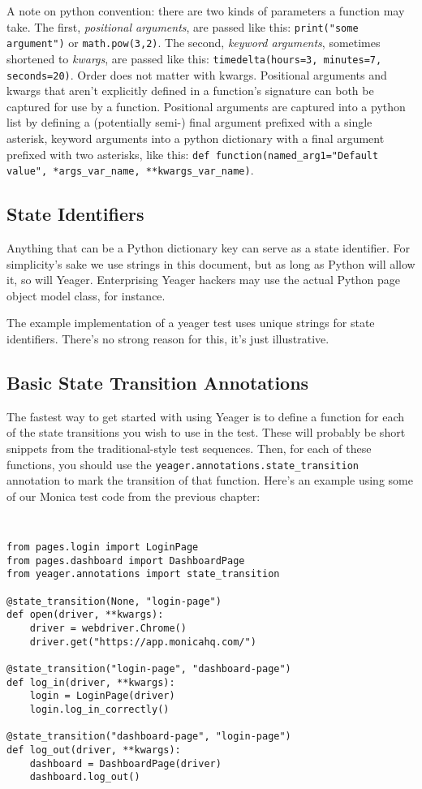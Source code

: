 A note on python convention: there are two kinds of parameters a function may take. The first, \textit{positional arguments}, are passed like this: \texttt{print("some argument")} or \texttt{math.pow(3,2)}. The second, \textit{keyword arguments}, sometimes shortened to \textit{kwargs}, are passed like this: \texttt{timedelta(hours=3, minutes=7, seconds=20)}. Order does not matter with kwargs. Positional arguments and kwargs that aren't explicitly defined in a function's signature can both be captured for use by a function. Positional arguments are captured into a python list by defining a (potentially semi-) final argument prefixed with a single asterisk, keyword arguments into a python dictionary with a final argument prefixed with two asterisks, like this: \texttt{def function(named\_arg1="Default value", *args\_var\_name, **kwargs\_var\_name)}.

\subsection{State Identifiers}
Anything that can be a Python dictionary key can serve as a state identifier. For simplicity's sake we use strings in this document, but as long as Python will allow it, so will Yeager. Enterprising Yeager hackers may use the actual Python page object model class, for instance.

The example implementation of a yeager test uses unique strings for state identifiers. There's no strong reason for this, it's just illustrative.

\subsection{Basic State Transition Annotations}
The fastest way to get started with using Yeager is to define a function for each of the state transitions you wish to use in the test. These will probably be short snippets from the traditional-style test sequences. Then, for each of these functions, you should use the \texttt{yeager.annotations.state\_transition} annotation to mark the transition of that function. Here's an example using some of our Monica test code from the previous chapter:

{\tt
\begin{verbatim}
from pages.login import LoginPage
from pages.dashboard import DashboardPage
from yeager.annotations import state_transition

@state_transition(None, "login-page")
def open(driver, **kwargs):
    driver = webdriver.Chrome()
    driver.get("https://app.monicahq.com/")

@state_transition("login-page", "dashboard-page")
def log_in(driver, **kwargs):
    login = LoginPage(driver)
    login.log_in_correctly()

@state_transition("dashboard-page", "login-page")
def log_out(driver, **kwargs):
    dashboard = DashboardPage(driver)
    dashboard.log_out()
\end{verbatim}
}


